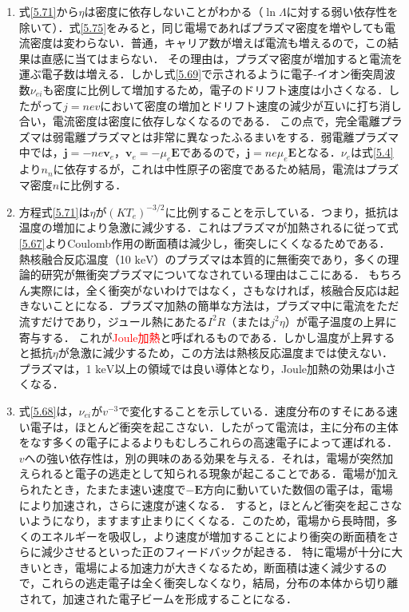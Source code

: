 \documentclass{ltjsarticle}
\numberwithin{equation}{section} %
\begin{document}
\begin{enumerate}
\item[(a)] 式\eqref{5.71}から$\eta$は密度に依存しないことがわかる（$\ln{\Lambda}$に対する弱い依存性を除いて）．式\eqref{5.75}をみると，同じ電場であればプラズマ密度を増やしても電流密度は変わらない．普通，キャリア数が増えば電流も増えるので，この結果は直感に当てはまらない．
           その理由は，プラズマ密度が増加すると電流を運ぶ電子数は増える．しかし式\eqref{5.69}で示されるように電子‐イオン衝突周波数$\nu_{ei}$も密度に比例して増加するため，電子のドリフト速度は小さくなる．したがって$j=nev$において密度の増加とドリフト速度の減少が互いに打ち消し合い，電流密度は密度に依存しなくなるのである．
           この点で，完全電離プラズマは弱電離プラズマとは非常に異なったふるまいをする．弱電離プラズマ中では，$\bm{j}=-ne\bm{v}_e$，$\bm{v}_e=-\mu_e\bm{E}$であるので，$\bm{j}=ne\mu_e\bm{E}$となる．$\nu_e$は式\eqref{5.4}より$n_n$に依存するが，これは中性原子の密度であるため結局，電流はプラズマ密度$n$に比例する．

\item[(b)] 方程式\eqref{5.71}は$\eta$が$(KT_e)^{-3/2}$に比例することを示している．つまり，抵抗は温度の増加により急激に減少する．これはプラズマが加熱されるに従って式\eqref{5.67}よりCoulomb作用の断面積は減少し，衝突しにくくなるためである．
           熱核融合反応温度（10 $\mathrm{keV}$）のプラズマは本質的に無衝突であり，多くの理論的研究が無衝突プラズマについてなされている理由はここにある．
           もちろん実際には，全く衝突がないわけではなく，さもなければ，核融合反応は起きないことになる．プラズマ加熱の簡単な方法は，プラズマ中に電流をただ流すだけであり，ジュール熱にあたる$I^2R$（または$j^2\eta$）が電子温度の上昇に寄与する．
           これが\textcolor{red}{Joule加熱}と呼ばれるものである．しかし温度が上昇すると抵抗$\eta$が急激に減少するため，この方法は熱核反応温度までは使えない．
           プラズマは，1 $\mathrm{keV}$以上の領域では良い導体となり，Joule加熱の効果は小さくなる．

\item[(c)] 式\eqref{5.68}は，$\nu_{ei}$が$v^{-3}$で変化することを示している．速度分布のすそにある速い電子は，ほとんど衝突を起こさない．したがって電流は，主に分布の主体をなす多くの電子によるよりもむしろこれらの高速電子によって運ばれる．
           $v$への強い依存性は，別の興味のある効果を与える．それは，電場が突然加えられると電子の逃走として知られる現象が起こることである．電場が加えられたとき，たまたま速い速度で$-\bm{E}$方向に動いていた数個の電子は，電場により加速され，さらに速度が速くなる．
           すると，ほとんど衝突を起こさないようになり，ますます止まりにくくなる．このため，電場から長時間，多くのエネルギーを吸収し，より速度が増加することにより衝突の断面積をさらに減少させるといった正のフィードバックが起きる．
           特に電場が十分に大きいとき，電場による加速力が大きくなるため，断面積は速く減少するので，これらの逃走電子は全く衝突しなくなり，結局，分布の本体から切り離されて，加速された電子ビームを形成することになる．
\end{enumerate}
\end{document}
